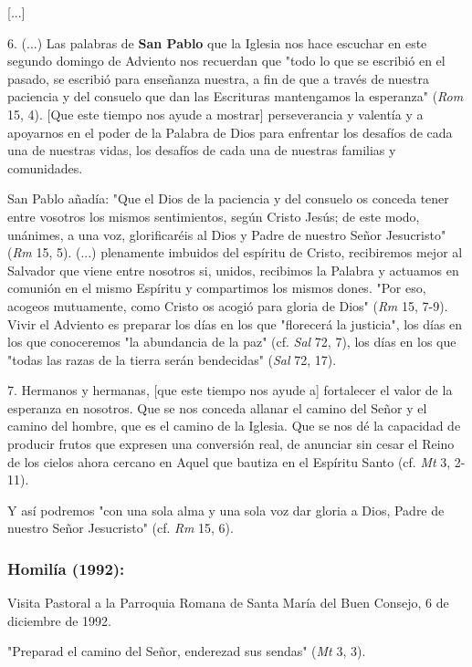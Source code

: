 {[}...{]}

6. (...) Las palabras de \textbf{San Pablo} que la Iglesia nos hace
escuchar en este segundo domingo de Adviento nos recuerdan que "todo lo
que se escribió en el pasado, se escribió para enseñanza nuestra, a fin
de que a través de nuestra paciencia y del consuelo que dan las
Escrituras mantengamos la esperanza" (\emph{Rom} 15, 4). {[}Que este
tiempo nos ayude a mostrar{]} perseverancia y valentía y a apoyarnos en
el poder de la Palabra de Dios para enfrentar los desafíos de cada una
de nuestras vidas, los desafíos de cada una de nuestras familias y
comunidades.

San Pablo añadía: "Que el Dios de la paciencia y del consuelo os conceda
tener entre vosotros los mismos sentimientos, según Cristo Jesús; de
este modo, unánimes, a una voz, glorificaréis al Dios y Padre de nuestro
Señor Jesucristo" (\emph{Rm} 15, 5). (...) plenamente imbuidos del
espíritu de Cristo, recibiremos mejor al Salvador que viene entre
nosotros si, unidos, recibimos la Palabra y actuamos en comunión en el
mismo Espíritu y compartimos los mismos dones. "Por eso, acogeos
mutuamente, como Cristo os acogió para gloria de Dios" (\emph{Rm} 15,
7-9). Vivir el Adviento es preparar los días en los que "florecerá la
justicia", los días en los que conoceremos "la abundancia de la paz"
(cf. \emph{Sal} 72, 7), los días en los que "todas las razas de la
tierra serán bendecidas" (\emph{Sal} 72, 17).

7. Hermanos y hermanas, {[}que este tiempo nos ayude a{]} fortalecer el
valor de la esperanza en nosotros. Que se nos conceda allanar el camino
del Señor y el camino del hombre, que es el camino de la Iglesia. Que se
nos dé la capacidad de producir frutos que expresen una conversión real,
de anunciar sin cesar el Reino de los cielos ahora cercano en Aquel que
bautiza en el Espíritu Santo (cf. \emph{Mt} 3, 2-11).

Y así podremos "con una sola alma y una sola voz dar gloria a Dios,
Padre de nuestro Señor Jesucristo" (cf. \emph{Rm} 15, 6).

\subsubsection{Homilía (1992): }

Visita Pastoral a la Parroquia Romana de Santa María del Buen Consejo, 6
de diciembre de 1992.

"Preparad el camino del Señor, enderezad sus sendas" (\emph{Mt} 3, 3).

